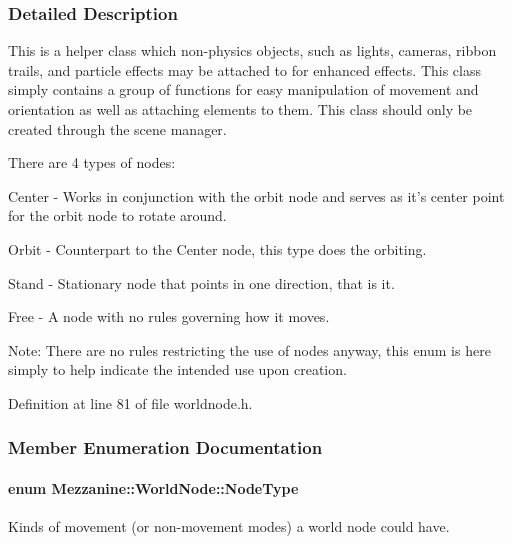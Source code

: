 \subsubsection{Detailed Description}
This is a helper class which non-\/physics objects, such as lights, cameras, ribbon trails, and particle effects may be attached to for enhanced effects. This class simply contains a group of functions for easy manipulation of movement and orientation as well as attaching elements to them. This class should only be created through the scene manager. \par
 There are 4 types of nodes: \par
 Center -\/ Works in conjunction with the orbit node and serves as it's center point for the orbit node to rotate around. \par
 Orbit -\/ Counterpart to the Center node, this type does the orbiting. \par
 Stand -\/ Stationary node that points in one direction, that is it. \par
 Free -\/ A node with no rules governing how it moves. \par
 Note: There are no rules restricting the use of nodes anyway, this enum is here simply to help indicate the intended use upon creation. 

Definition at line 81 of file worldnode.h.



\subsubsection{Member Enumeration Documentation}
\hypertarget{classMezzanine_1_1WorldNode_a7b41cfe149e688905e56fb395d6a2493}{
\paragraph[{NodeType}]{\setlength{\rightskip}{0pt plus 5cm}enum {\bf Mezzanine::WorldNode::NodeType}}\hfill}
\label{classMezzanine_1_1WorldNode_a7b41cfe149e688905e56fb395d6a2493}


Kinds of movement (or non-\/movement modes) a world node could have. 


